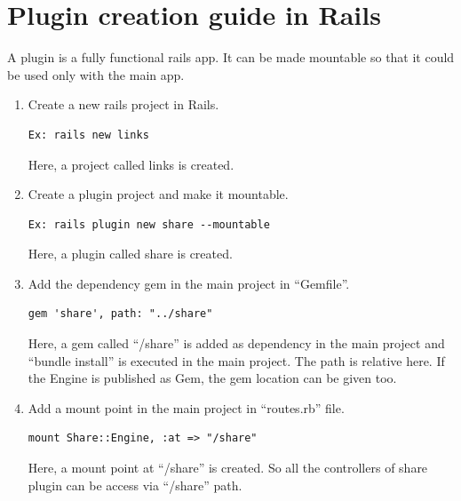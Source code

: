 \documentclass[11pt]{report} %
\begin{document}
\section*{Plugin creation guide in Rails}
A plugin is a fully functional rails app. It can be made mountable so that it could be used only with the main app.

\begin{enumerate}
	\item
	Create a new rails project in Rails. 
	\begin{lstlisting}
Ex: rails new links
	\end{lstlisting}
	Here, a project called links is created.

	\item
	Create a plugin project and make it mountable.
	\begin{lstlisting}
Ex: rails plugin new share --mountable
	\end{lstlisting}
	Here, a plugin called share is created.

	\item
	Add the dependency gem in the main project in ``Gemfile''.
	\begin{lstlisting}
gem 'share', path: "../share"
	\end{lstlisting}
	Here, a gem called ``/share'' is added as dependency in the main project and ``bundle install'' is executed in the main project. The path is relative here. If the Engine is published as Gem, the gem location can be given too.
		
	\item
	Add a mount point in the main project in ``routes.rb'' file.
	\begin{lstlisting}
mount Share::Engine, :at => "/share"
	\end{lstlisting}
	Here, a mount point at ``/share'' is created. So all the controllers of share plugin can be access via ``/share'' path.
	
\end{enumerate}
\end{document}
